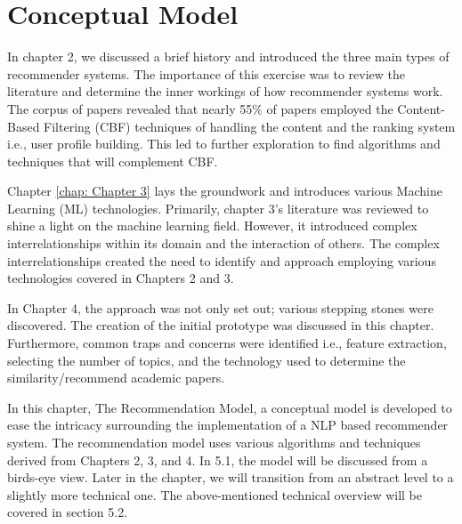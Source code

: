 \chapter{Conceptual Model}
\label{chap: Chapter 5}
In chapter 2, we discussed a brief history and introduced the three main types of recommender systems. The importance of this exercise was to review the literature and determine the inner workings of how recommender systems work. The corpus of papers revealed that nearly 55\% of papers employed the Content-Based Filtering (CBF) techniques of handling the content and the ranking system i.e., user profile building. This led to further exploration to find algorithms and techniques that will complement CBF. 

Chapter \ref{chap: Chapter 3} lays the groundwork and introduces various Machine Learning (ML) technologies. Primarily, chapter 3's literature was reviewed to shine a light on the machine learning field. However, it introduced complex interrelationships within its domain and the interaction of others. The complex interrelationships created the need to identify and approach employing various technologies covered in Chapters 2 and 3. 

In Chapter 4, the approach was not only set out; various stepping stones were discovered. The creation of the initial prototype was discussed in this chapter. Furthermore, common traps and concerns were identified i.e., feature extraction, selecting the number of topics, and the technology used to determine the similarity/recommend academic papers. 

In this chapter, The Recommendation Model, a conceptual model is developed to ease the intricacy surrounding the implementation of a NLP based recommender system. The recommendation model uses various algorithms and techniques derived from Chapters 2, 3, and 4. In 5.1, the model will be discussed from a birds-eye view. Later in the chapter, we will transition from an abstract level to a slightly more technical one. The above-mentioned technical overview will be covered in section 5.2.

